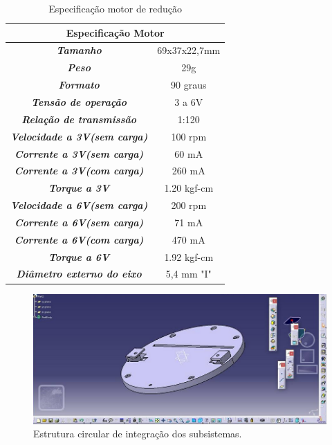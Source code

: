 			\begin{table}[H]
				\centering
				\caption{Especificação motor de redução}
				\label{tab:motor_red}
				\begin{tabular}{|c|c|}
					\hline
					\multicolumn{2}{|c|}{\cellcolor[HTML]{C0C0C0}\textbf{Especificação Motor}} \\ \hline
					\textit{\textbf{Tamanho}}                            & 69x37x22,7mm        \\ \hline
					\textit{\textbf{Peso}}                               & 29g                 \\ \hline
					\textit{\textbf{Formato}}                            & 90 graus            \\ \hline
					\textit{\textbf{Tensão de operação}}                 & 3 a 6V              \\ \hline
					\textit{\textbf{Relação de transmissão}}             & 1:120               \\ \hline
					\textit{\textbf{Velocidade a 3V(sem carga)}}         & 100 rpm             \\ \hline
					\textit{\textbf{Corrente a 3V(sem carga)}}           & 60 mA               \\ \hline
					\textit{\textbf{Corrente a 3V(com carga)}}           & 260 mA              \\ \hline
					\textit{\textbf{Torque a 3V}}                        & 1.20 kgf-cm         \\ \hline
					\textit{\textbf{Velocidade a 6V(sem carga)}}         & 200 rpm             \\ \hline
					\textit{\textbf{Corrente a 6V(sem carga)}}           & 71 mA               \\ \hline
					\textit{\textbf{Corrente a 6V(com carga)}}           & 470 mA              \\ \hline
					\textit{\textbf{Torque a 6V}}                        & 1.92 kgf-cm         \\ \hline
					\textit{\textbf{Diâmetro externo do eixo}}           & 5,4 mm "I"          \\ \hline
				\end{tabular}
			\end{table}

			\begin{figure}[H]
				\centering
				\includegraphics[scale=0.5]{figuras/estrutura_circular.png}
				\caption{Estrutura circular de integração dos subsistemas.}
				\label{img:estrutura_circular}
			\end{figure}

